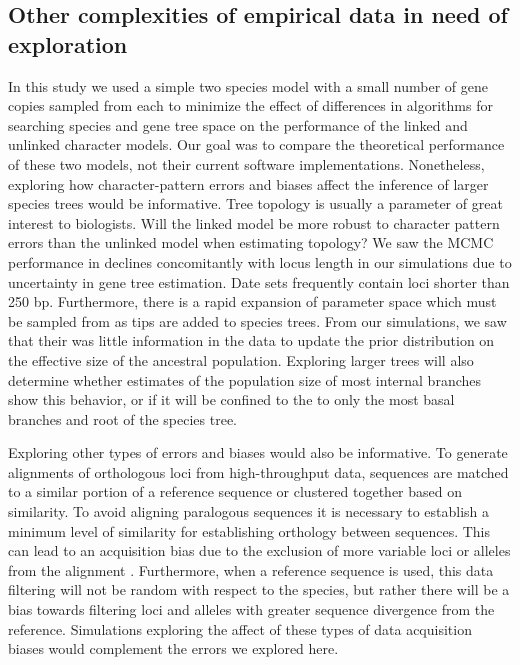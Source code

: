 \subsection{Other complexities of empirical data in need of exploration}
In this study we used a simple two species model with a small number of gene
copies sampled from each to minimize the effect of differences in algorithms
for searching species and gene tree space on the performance of the linked and
unlinked character models.
Our goal was to compare the theoretical performance of these two models, not
their current software implementations.
Nonetheless, exploring how character-pattern errors and biases affect
the inference of larger species trees would be informative.
Tree topology is usually a parameter of great interest to biologists. Will 
the linked model be more robust to character pattern errors than the unlinked 
model when estimating topology? We saw the MCMC performance in \beast declines 
concomitantly with locus length in our simulations due to uncertainty in gene 
tree estimation. Date sets frequently contain loci shorter than 250 bp. Furthermore,
there is a rapid expansion of parameter space which must be sampled from as tips are 
added to species trees. From our simulations, we saw that their was little information in the data to
update the prior distribution on the effective size of the ancestral population.
Exploring larger trees will also determine whether estimates of the population size
of most internal branches show this behavior, or if it will be confined to the
to only the most basal branches and root of the species tree.


Exploring other types of errors and biases would also be informative.
To generate alignments of orthologous loci from high-throughput data, 
sequences are matched to a similar portion of a reference sequence or 
clustered together based on similarity. To avoid aligning paralogous sequences 
it is necessary to establish a minimum level of similarity for establishing 
orthology between sequences. This can lead to an acquisition bias due to the 
exclusion of more variable loci or alleles from the alignment \citep{huang2016unforeseen}.
Furthermore, when a reference 
sequence is used, this data filtering will not be random with respect to the
species, but rather there will be a bias towards filtering loci and alleles
with greater sequence divergence from the reference. 
Simulations exploring the affect of these types of data acquisition biases
would complement the errors we explored here.

